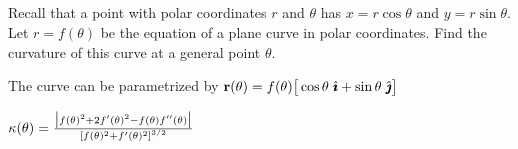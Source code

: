 \subsection*{\Procedural}

\begin{question}\label{prb polar curvature}
Recall that a point with polar coordinates $r$ and
$\theta$ has $x=r\cos\theta$ and $y=r\sin\theta$. Let $r=f(\theta)$ be 
the equation of a plane curve in polar coordinates. Find the 
curvature of this curve at a general point $\theta$. 
\end{question}

\begin{hint} 
The curve can be parametrized by 
$\mathbf{r}(\theta)= f(\theta)\big[\cos\theta\ \hat{\pmb{\imath}} + \sin\theta\ \hat{\pmb{\jmath}}\big]$
\end{hint}

\begin{answer} 
$\kappa(\theta)=\frac{\big|f(\theta)^2+2f'(\theta)^2-f(\theta)f''(\theta)\big|}
                     {{[f(\theta)^2+f'(\theta)^2]}^{3/2}}$
\end{answer}


